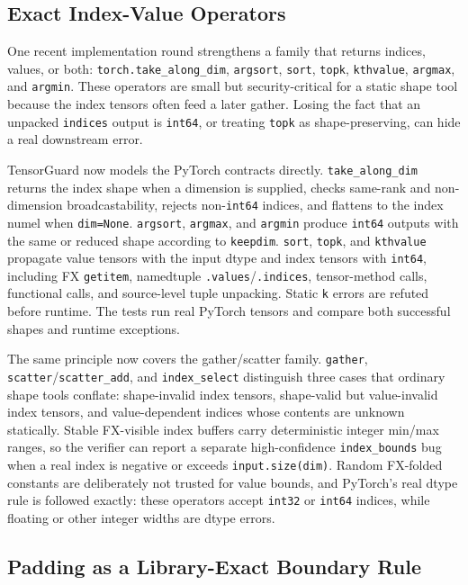 \documentclass[11pt]{article}
\newcommand{\tg}{TensorGuard}
\begin{document}
\subsection{Exact Index-Value Operators}

One recent implementation round strengthens a family that returns
indices, values, or both: \texttt{torch.take\_along\_dim}, \texttt{argsort},
\texttt{sort}, \texttt{topk}, \texttt{kthvalue}, \texttt{argmax}, and
\texttt{argmin}.  These operators are small but security-critical for a static
shape tool because the index tensors often feed a later gather.  Losing the fact
that an unpacked \texttt{indices} output is \texttt{int64}, or treating
\texttt{topk} as shape-preserving, can hide a real downstream error.

\tg{} now models the PyTorch contracts directly.  \texttt{take\_along\_dim}
returns the index shape when a dimension is supplied, checks same-rank and
non-dimension broadcastability, rejects non-\texttt{int64} indices, and flattens
to the index numel when \texttt{dim=None}.  \texttt{argsort}, \texttt{argmax},
and \texttt{argmin} produce \texttt{int64} outputs with the same or reduced
shape according to \texttt{keepdim}.  \texttt{sort}, \texttt{topk}, and
\texttt{kthvalue} propagate value tensors with the input dtype and index tensors
with \texttt{int64}, including FX \texttt{getitem}, namedtuple
\texttt{.values}/\texttt{.indices}, tensor-method calls, functional calls, and
source-level tuple unpacking.  Static \texttt{k} errors are refuted before
runtime.  The tests run real PyTorch tensors and compare both successful shapes
and runtime exceptions.

The same principle now covers the gather/scatter family.  \texttt{gather},
\texttt{scatter}/\texttt{scatter\_add}, and \texttt{index\_select} distinguish
three cases that ordinary shape tools conflate: shape-invalid index tensors,
shape-valid but value-invalid index tensors, and value-dependent indices whose
contents are unknown statically.  Stable FX-visible index buffers carry
deterministic integer min/max ranges, so the verifier can report a separate
high-confidence \texttt{index\_bounds} bug when a real index is negative or
exceeds \texttt{input.size(dim)}.  Random FX-folded constants are deliberately not
trusted for value bounds, and PyTorch's real dtype rule is followed exactly:
these operators accept \texttt{int32} or \texttt{int64} indices, while floating or
other integer widths are dtype errors.

\subsection{Padding as a Library-Exact Boundary Rule}
\end{document}
